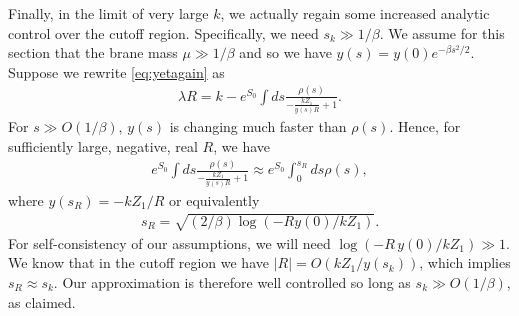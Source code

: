 \documentclass[12pt]{article}
\newcommand{\smax}{s_k}
\numberwithin{equation}{section}
\begin{document}
Finally, in the limit of very large $k$, we actually regain some increased analytic control over the cutoff region. Specifically, we need $\smax \gg 1/\beta$. We assume for this section that the brane mass $\mu \gg 1/\beta$ and so we have $y(s) = y(0)e^{-\beta s^2/2}$. Suppose we rewrite \eqref{eq:yetagain} as
\begin{align} \label{eq:yetyetagain}
\lambda R = k - e^{S_0} \int ds \frac{\rho(s)}{- \frac{k Z_1}{y(s) R} + 1}.
\end{align}
For $s \gg O(1/\beta)$, $y(s)$ is changing much faster than $\rho(s)$. Hence, for sufficiently large, negative, real $R$, we have
\begin{align}
e^{S_0} \int ds \frac{\rho(s)}{- \frac{k Z_1}{y(s) R} + 1} \approx e^{S_0} \int_0^{s_R} ds \rho(s),
\end{align}
where $y(s_R) = - k Z_1 / R$ or equivalently 
\begin{align}\label{eq:sR}
s_R = \sqrt{(2/\beta)  \log (- Ry(0)/k Z_1)}.
\end{align} 
For self-consistency of our assumptions, we will need $\log (- R \,y(0)/k Z_1) \gg 1$. We know that in the cutoff region we have $|R| = O(kZ_1/y(\smax))$, which implies $s_R \approx \smax$. Our approximation is therefore well controlled so long as $\smax \gg O(1/\beta)$, as claimed. 
\end{document}
